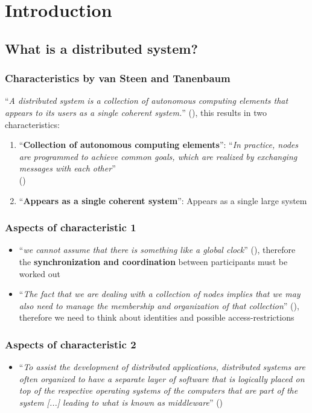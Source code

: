 \documentclass[12pt,A4]{extarticle}
\begin{document}
\disclaimer

\tableofcontents
\clearpage

\section{Introduction}
\subsection{What is a distributed system?}
\subsubsection{Characteristics by van Steen and Tanenbaum}
``\textit{A distributed system is a collection of autonomous computing elements that appears to its users as a single coherent system.}'' (\cite{DistributedSystemVanSteenTanenbaum}), this results in two characteristics:
\begin{enumerate}
  \item{``\textbf{Collection of autonomous computing elements}'': ``\textit{In practice, nodes are programmed to achieve common goals, which are realized by exchanging messages with each other}'' \\(\cite{DistributedSystemVanSteenTanenbaum})}
  \item{``\textbf{Appears as a single coherent system}'': Appears as a single large system}
\end{enumerate}

\subsubsection{Aspects of characteristic 1}
\begin{itemize}
  \item{``\textit{we cannot assume that there is something like a global clock}'' (\cite{DistributedSystemVanSteenTanenbaum}), therefore the \textbf{synchronization and coordination} between participants must be worked out}
  \item{``\textit{The fact that we are dealing with a collection of nodes implies that we may also need to manage the membership and organization of that collection}'' (\cite{DistributedSystemVanSteenTanenbaum}), therefore we need to think about identities and possible access-restrictions}
\end{itemize}

\subsubsection{Aspects of characteristic 2}
\begin{itemize}
  \item{``\textit{To assist the development of distributed applications, distributed systems are often organized to have a separate layer of software that is logically placed on top of the respective operating systems of the computers that are part of the system [...] leading to what is known as middleware}'' (\cite{DistributedSystemVanSteenTanenbaum})}
\end{itemize}
\end{document}
